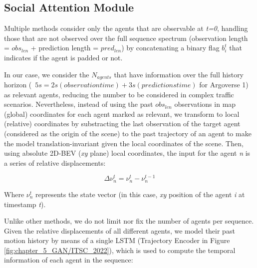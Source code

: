 \subsection{Social Attention Module}
\label{subsec:5_attention_module}

Multiple methods \cite{liang2020learning, schmidt2022crat} consider only the agents that are observable at \textit{t=0}, handling those that are not observed over the full sequence spectrum (observation length = \textit{$obs_{len}$} + prediction length = \textit{$pred_{len}$}) by concatenating a binary flag $b_i^t$ that indicates if the agent is padded or not. 

In our case, we consider the $N_{agents}$ that have information over the full history horizon (\eg \ $5s = 2s (observation time) + 3s (predictions time)$ for Argoverse 1) as relevant agents, reducing the number to be considered in complex traffic scenarios. Nevertheless, instead of using the past $obs_{len}$ observations in map (global) coordinates for each agent marked as relevant, we transform to local (relative) coordinates by substracting the last observation of the target agent (considered as the origin of the scene) to the past trajectory of an agent to make the model translation-invariant given the local coordinates of the scene. Then, using absolute 2D-\ac{BEV} (\textit{xy} plane) local coordinates, the input for the agent \textit{n} is a series of relative displacements:

\begin{equation}
	\label{eq:5_relative_displacements}
	\Delta \nu^{t}_n = \nu^{t}_n - \nu^{t-1}_n
\end{equation}

Where $\nu^{t}_n$ represents the state vector (in this case, \textit{xy} position of the agent \textit{i} at timestamp \textit{t}). %

Unlike other methods, we do not limit nor fix the number of agents per sequence. Given the relative displacements of all different agents, we model their past motion history by means of a single \ac{LSTM} (Trajectory Encoder in Figure \ref{fig:chapter_5_GAN/ITSC_2022}), which is used to compute the temporal information of each agent in the sequence:

